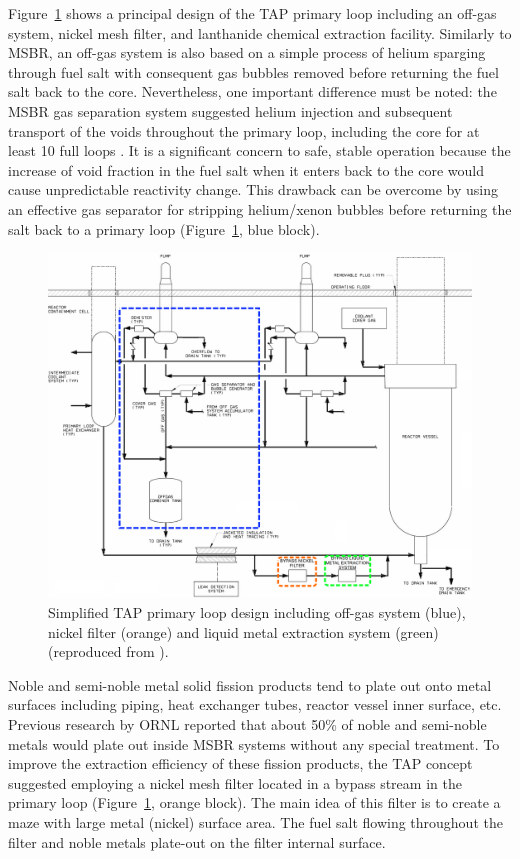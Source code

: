 \documentclass[12pt]{article} %
\begin{document}
Figure~\ref{fig:tap-reproc} shows a principal design of the \gls{TAP} primary 
loop including an off-gas system, nickel mesh filter, and lanthanide chemical 
extraction facility. Similarly to \gls{MSBR}, an off-gas system is 
also based on a simple process of helium sparging through fuel salt 
with consequent gas bubbles removed before returning the 
fuel salt back to the core. Nevertheless, one important difference must be noted: the
\gls{MSBR} gas separation system suggested helium injection and subsequent 
transport of the voids throughout the primary loop, including the core 
for at least 10 full loops \cite{robertson_conceptual_1971}. It is a 
significant concern to safe, stable 
operation because the increase of void fraction in the fuel salt when it enters back 
to the core 
would cause unpredictable reactivity change. This drawback can be overcome by 
using an effective gas separator for stripping helium/xenon bubbles before 
returning the salt back to a primary loop (Figure~\ref{fig:tap-reproc}, blue 
block). 
\begin{figure}[htp!] %
  \centering
		  \includegraphics[width=\textwidth]{tap_primary_loop.png}
  \caption{Simplified \gls{TAP} primary loop design including off-gas system (blue), 
  nickel filter (orange) and liquid metal extraction system (green) (reproduced from \cite{transatomic_power_transatomic_2019}).}
  \label{fig:tap-reproc}
\end{figure}

Noble and semi-noble metal solid fission products tend to plate out onto metal 
surfaces including piping, heat exchanger tubes, reactor vessel inner surface, etc. 
Previous research by \gls{ORNL} \cite{robertson_conceptual_1971} reported that 
about 50\% of noble and semi-noble metals would plate out inside \gls{MSBR} 
systems without any special treatment. To improve the extraction efficiency of 
these fission products, the \gls{TAP} concept suggested employing a 
nickel mesh filter located 
in a bypass stream in the primary loop (Figure~\ref{fig:tap-reproc}, orange block). 
The main idea of this filter is to create a maze with large metal (nickel) 
surface area. The fuel salt flowing throughout the filter and noble 
metals plate-out on the filter internal surface. 
\end{document}
